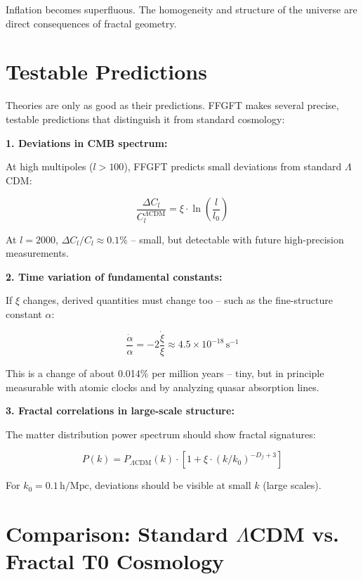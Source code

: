 Inflation becomes superfluous. The homogeneity and structure of the universe are direct consequences of fractal geometry.

\section{Testable Predictions}

Theories are only as good as their predictions. FFGFT makes several precise, testable predictions that distinguish it from standard cosmology:

\textbf{1. Deviations in CMB spectrum:}

At high multipoles ($l > 100$), FFGFT predicts small deviations from standard $\Lambda$CDM:

\begin{equation}
\frac{\Delta C_l}{C_l^{\Lambda\text{CDM}}} = \xi \cdot \ln\left(\frac{l}{l_0}\right)
\end{equation}

At $l = 2000$, $\Delta C_l/C_l \approx 0.1\%$ -- small, but detectable with future high-precision measurements.

\textbf{2. Time variation of fundamental constants:}

If $\xi$ changes, derived quantities must change too -- such as the fine-structure constant $\alpha$:

\begin{equation}
\frac{\dot{\alpha}}{\alpha} = -2 \frac{\dot{\xi}}{\xi} \approx 4.5 \times 10^{-18} \, \text{s}^{-1}
\end{equation}

This is a change of about 0.014\% per million years -- tiny, but in principle measurable with atomic clocks and by analyzing quasar absorption lines.

\textbf{3. Fractal correlations in large-scale structure:}

The matter distribution power spectrum should show fractal signatures:

\begin{equation}
P(k) = P_{\Lambda\text{CDM}}(k) \cdot \left[1 + \xi \cdot (k/k_0)^{-D_f+3}\right]
\end{equation}

For $k_0 = 0.1 \, \text{h/Mpc}$, deviations should be visible at small $k$ (large scales).

\section{Comparison: Standard $\Lambda$CDM vs. Fractal T0 Cosmology}


